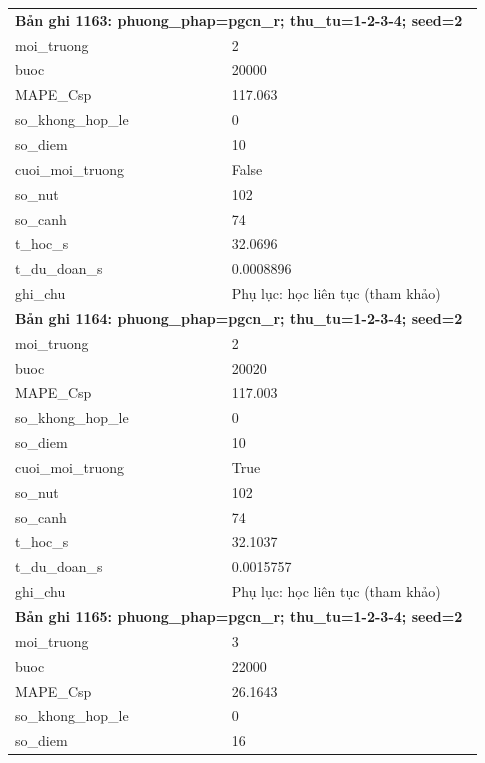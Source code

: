 \begin{longtable}{p{0.43\linewidth}p{0.50\linewidth}}
\midrule
\multicolumn{2}{p{0.95\linewidth}}{\textbf{Bản ghi 1163: phuong\_phap=pgcn\_r; thu\_tu=1-2-3-4; seed=2}} \\
moi\_\allowbreak truong & 2 \\
buoc & 20000 \\
MAPE\_\allowbreak Csp & 117.063 \\
so\_\allowbreak khong\_\allowbreak hop\_\allowbreak le & 0 \\
so\_\allowbreak diem & 10 \\
cuoi\_\allowbreak moi\_\allowbreak truong & False \\
so\_\allowbreak nut & 102 \\
so\_\allowbreak canh & 74 \\
t\_\allowbreak hoc\_\allowbreak s & 32.0696 \\
t\_\allowbreak du\_\allowbreak doan\_\allowbreak s & 0.0008896 \\
ghi\_\allowbreak chu & Phụ lục: học liên tục (tham khảo) \\
\midrule
\multicolumn{2}{p{0.95\linewidth}}{\textbf{Bản ghi 1164: phuong\_phap=pgcn\_r; thu\_tu=1-2-3-4; seed=2}} \\
moi\_\allowbreak truong & 2 \\
buoc & 20020 \\
MAPE\_\allowbreak Csp & 117.003 \\
so\_\allowbreak khong\_\allowbreak hop\_\allowbreak le & 0 \\
so\_\allowbreak diem & 10 \\
cuoi\_\allowbreak moi\_\allowbreak truong & True \\
so\_\allowbreak nut & 102 \\
so\_\allowbreak canh & 74 \\
t\_\allowbreak hoc\_\allowbreak s & 32.1037 \\
t\_\allowbreak du\_\allowbreak doan\_\allowbreak s & 0.0015757 \\
ghi\_\allowbreak chu & Phụ lục: học liên tục (tham khảo) \\
\midrule
\multicolumn{2}{p{0.95\linewidth}}{\textbf{Bản ghi 1165: phuong\_phap=pgcn\_r; thu\_tu=1-2-3-4; seed=2}} \\
moi\_\allowbreak truong & 3 \\
buoc & 22000 \\
MAPE\_\allowbreak Csp & 26.1643 \\
so\_\allowbreak khong\_\allowbreak hop\_\allowbreak le & 0 \\
so\_\allowbreak diem & 16 \\

\end{longtable}
